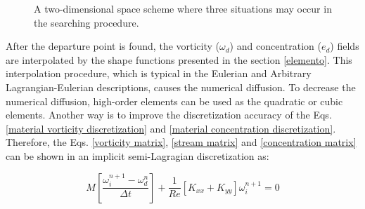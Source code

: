 \begin{figure}[H]
\begin{center}
\end{center}
\caption{
A two-dimensional space scheme
where three situations may occur in the searching procedure.
}
\label{three situations fig}
\end{figure}


\medskip
After the departure point is found, the vorticity ($\omega_{d}$) and 
concentration ($e_{d}$) fields are interpolated by the shape functions
presented in the section \ref{elemento}.
This interpolation procedure, which is typical in the
Eulerian and Arbitrary Lagrangian-Eulerian descriptions,
causes the numerical diffusion.
To decrease the numerical diffusion, high-order elements
can be used as the quadratic or cubic elements.
Another way is to improve the discretization accuracy of the Eqs.
\ref{material vorticity discretization} and
\ref{material concentration discretization}.
Therefore, the Eqs. 
\ref{vorticity matrix},
\ref{stream matrix} and
\ref{concentration matrix} 
can be shown 
in an
implicit semi-Lagragian 
discretization as:

\begin{equation}
 M \left[ \frac{\omega^{n+1}_{i} - \omega^{n}_{d}}{\Delta t} \right] 
 + \frac{1}{\textit{Re}} \left[ K_{xx} + K_{yy} \right] \omega^{n+1}_{i}
 = 0
\end{equation}

